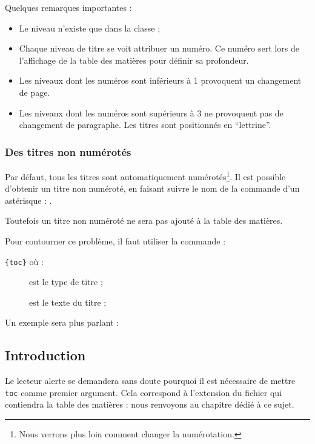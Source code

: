 Quelques remarques importantes :
\begin{itemize}
\item Le niveau  n'existe que dans la classe  ;
\item Chaque niveau de titre se voit attribuer un numéro. Ce numéro sert lors de l'affichage de la table des matières pour définir sa profondeur.\label{numeroniveau}
\item Les niveaux dont les numéros sont inférieurs à 1 provoquent un changement de page.
\item Les niveaux dont les numéros sont supérieurs à 3 ne provoquent pas de changement de paragraphe. Les titres sont positionnés en \enquote{lettrine}.
\end{itemize}

\subsection{Des titres non numérotés}\label{titresansnumero}
Par défaut, tous les titres sont automatiquement numérotés\footnote{Nous verrons plus loin comment changer la numérotation.}. Il est possible d'obtenir un titre non numéroté, en faisant suivre le nom de la commande d'un astérisque : .


Toutefois un titre non numéroté ne sera pas ajouté à la table des matières. 

Pour contourner ce problème, il faut utiliser la commande :

\verb|{toc}| où : \label{addcontentsline}

\begin{description}
    \item[] est le type de titre ;
    \item[] est le texte du titre ;
\end{description}

Un exemple sera plus parlant :


\begin{latexcode}
\chapter*{Introduction}
\end{latexcode}


\begin{plusloins}
Le lecteur alerte se demandera sans doute pourquoi il est nécessaire de mettre \verb|toc| comme premier argument. Cela correspond à l'extension du fichier qui contiendra la table des matières : nous renvoyons au chapitre dédié à ce sujet.
\end{plusloins}

